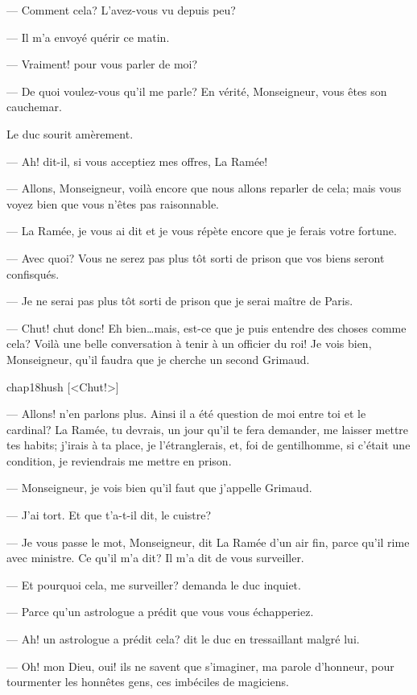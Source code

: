 — Comment cela? L'avez-vous vu depuis peu?

— Il m'a envoyé quérir ce matin.

— Vraiment! pour vous parler de moi?

— De quoi voulez-vous qu'il me parle? En vérité, Monseigneur, vous êtes son cauchemar.

Le duc sourit amèrement.

— Ah! dit-il, si vous acceptiez mes offres, La Ramée!

— Allons, Monseigneur, voilà encore que nous allons reparler de cela; mais vous voyez bien que vous n'êtes pas raisonnable.

— La Ramée, je vous ai dit et je vous répète encore que je ferais votre fortune.

— Avec quoi? Vous ne serez pas plus tôt sorti de prison que vos biens seront confisqués.

— Je ne serai pas plus tôt sorti de prison que je serai maître de Paris.

— Chut! chut donc! Eh bien\dots mais, est-ce que je puis entendre des choses comme cela? Voilà une belle conversation à tenir à un officier du roi! Je vois bien, Monseigneur, qu'il faudra que je cherche un second Grimaud.

\begin{bwbigpic}
	[\basicscale] 
	{chap18hush}
	[<Chut!>]
\end{bwbigpic}

— Allons! n'en parlons plus. Ainsi il a été question de moi entre toi et le cardinal? La Ramée, tu devrais, un jour qu'il te fera demander, me laisser mettre tes habits; j'irais à ta place, je l'étranglerais, et, foi de gentilhomme, si c'était une condition, je reviendrais me mettre en prison.

— Monseigneur, je vois bien qu'il faut que j'appelle Grimaud.

— J'ai tort. Et que t'a-t-il dit, le cuistre?

— Je vous passe le mot, Monseigneur, dit La Ramée d'un air fin, parce qu'il rime avec ministre. Ce qu'il m'a dit? Il m'a dit de vous surveiller.

— Et pourquoi cela, me surveiller? demanda le duc inquiet.

— Parce qu'un astrologue a prédit que vous vous échapperiez.

— Ah! un astrologue a prédit cela? dit le duc en tressaillant malgré lui.

— Oh! mon Dieu, oui! ils ne savent que s'imaginer, ma parole d'honneur, pour tourmenter les honnêtes gens, ces imbéciles de magiciens.

